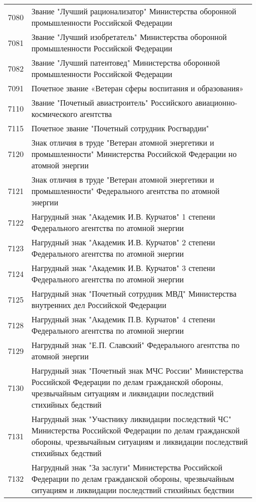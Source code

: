 \documentclass[10pt, a4paper, titlepage]{article}
\begin{document}
\begin{center}
\begin{longtable}{rp{}}
        7080 & Звание "Лучший рационализатор" Министерства оборонной промышленности Российской Федерации \\
        7081 & Звание "Лучший изобретатель" Министерства оборонной промышленности Российской Федерации \\
        7082 & Звание "Лучший патентовед" Министерства оборонной промышленности Российской Федерации \\
        7091 & Почетное звание «Ветеран сферы воспитания и образования» \\
        7110 & Звание "Почетный авиастроитель" Российского авиационно-космического агентства \\
        7115 & Почетное звание "Почетный сотрудник Росгвардии" \\
        7120 & Знак отличия в труде "Ветеран атомной энергетики и промышленности" Министерства Российской Федерации но атомной энергии \\
        7121 & Знак отличия в труде "Ветеран атомной энергетики и промышленности" Федерального агентства по атомной энергии \\
        7122 & Нагрудный знак "Академик И.В. Курчатов" 1 степени Федерального агентства по атомной энергии \\
        7123 & Нагрудный знак "Академик И.В. Курчатов" 2 степени Федерального агентства по атомной энергии \\
        7124 & Нагрудный знак "Академик И.В. Курчатов" 3 степени Федерального агентства по атомной энергии \\
        7125 & Нагрудный знак "Почетный сотрудник МВД" Министерства внутренних дел Российской Федерации \\
        7128 & Нагрудный знак "Академик П.В. Курчатов" 4 степени Федерального агентства по атомной энергии \\
        7129 & Нагрудный знак "Е.П. Славский" Федерального агентства по атомной энергии \\
        7130 & Нагрудный знак "Почетный знак МЧС России" Министерства Российской Федерации по делам гражданской обороны, чрезвычайным ситуациям и ликвидации последствий стихийных бедствий \\
        7131 & Нагрудный знак "Участнику ликвидации последствий ЧС" Министерства Российской Федерации по делам гражданской обороны, чрезвычайным ситуациям и ликвидации последствий стихийных бедствий \\
        7132 & Нагрудный знак "За заслуги" Министерства Российской Федерации по делам гражданской обороны, чрезвычайным ситуациям и ликвидации последствий стихийных бедствии \\

\end{longtable}
\end{center}
\end{document}
